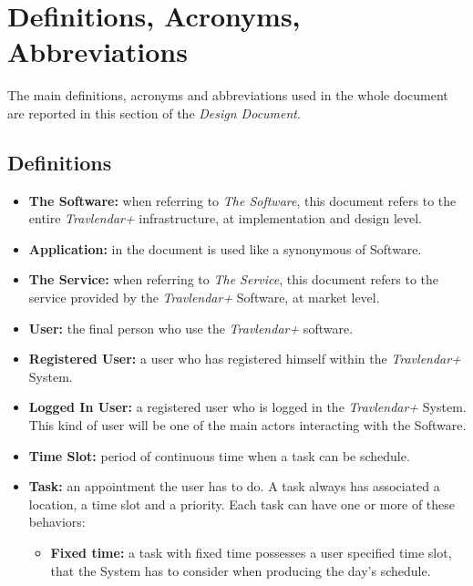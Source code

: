 \section{Definitions, Acronyms, Abbreviations}
The main definitions, acronyms and abbreviations used in the whole document are reported in this section of the \emph{Design Document}.

\subsection{Definitions}
\begin{itemize}
    \item   \textbf{The Software:} when referring to \emph{The Software}, this document refers to the entire                  \emph{Travlendar+} infrastructure, at implementation and design level.
        
    \item   \textbf{Application:} in the document is used like a synonymous of Software.
  
    \item   \textbf{The Service:}  when referring to \emph{The Service}, this document refers to the service provided         by the \emph{Travlendar+} Software, at market level.
    
    \item \textbf{User:} the final person who use the \emph{Travlendar+} software.
    
    \item \textbf{Registered User:} a user who has registered himself within the \emph{Travlendar+} System.
    
    \item \textbf{Logged In User:} a registered user who is logged in the \emph{Travlendar+} System. This kind of user will be one of the main actors interacting with the Software.
    
    \item \textbf{Time Slot:} period of continuous time when a task can be schedule.
    
    \item \textbf{Task:} an appointment the user has to do. A task always has associated a location, a time slot and a priority. Each task can have one or more of these behaviors:
    \begin{itemize}
        \item \textbf{Fixed time:} a task with fixed time possesses a user specified time slot, that the System has to consider when producing the day's schedule.


\end{itemize}
\end{itemize}
